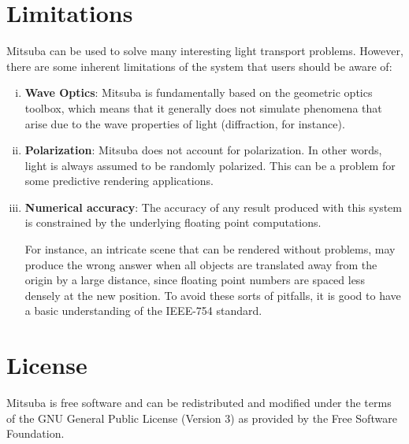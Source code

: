 \section{Limitations}
Mitsuba can be used to solve many interesting light transport problems.
However, there are some inherent limitations of the system that users should be aware of:
\begin{enumerate}[(i)]
\item \textbf{Wave Optics}: Mitsuba is fundamentally based on the geometric optics toolbox,
which means that it generally does not simulate phenomena that arise due to
the wave properties of light (diffraction, for instance).
\item \textbf{Polarization}: Mitsuba does not account for polarization. In
other words, light is always assumed to be randomly polarized. This can be a problem for
some predictive rendering applications.
\item \textbf{Numerical accuracy}: The accuracy of any result produced with this
system is constrained by the underlying floating point computations.

For instance, an intricate scene that can be rendered without problems,
may produce the wrong answer when all objects are translated away from the
origin by a large distance, since floating point numbers are spaced less densely at the
new position.  To avoid these sorts of pitfalls, it is good to have a basic
understanding of the IEEE-754 standard.
\end{enumerate}

\section{License}
Mitsuba is free software and can be redistributed and modified under the terms of the GNU General
Public License (Version 3) as provided by the Free Software Foundation.

